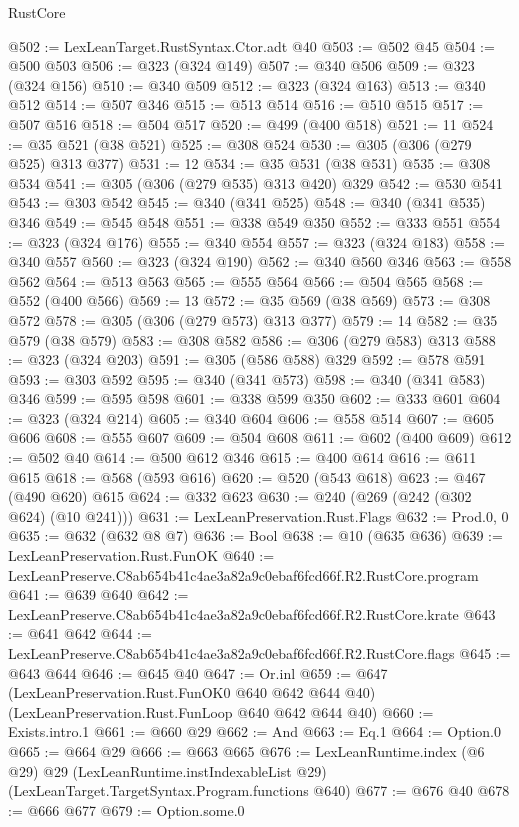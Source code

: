 \begin{lexlean}{RustCore}
\begin{coremodule}
@502 := LexLeanTarget.RustSyntax.Ctor.adt @40
@503 := @502 @45
@504 := @500 @503
@506 := @323 (@324 @149)
@507 := @340 @506
@509 := @323 (@324 @156)
@510 := @340 @509
@512 := @323 (@324 @163)
@513 := @340 @512
@514 := @507 @346
@515 := @513 @514
@516 := @510 @515
@517 := @507 @516
@518 := @504 @517
@520 := @499 (@400 @518)
@521 := 11
@524 := @35 @521 (@38 @521)
@525 := @308 @524
@530 := @305 (@306 (@279 @525) @313 @377)
@531 := 12
@534 := @35 @531 (@38 @531)
@535 := @308 @534
@541 := @305 (@306 (@279 @535) @313 @420) @329
@542 := @530 @541
@543 := @303 @542
@545 := @340 (@341 @525)
@548 := @340 (@341 @535) @346
@549 := @545 @548
@551 := @338 @549 @350
@552 := @333 @551
@554 := @323 (@324 @176)
@555 := @340 @554
@557 := @323 (@324 @183)
@558 := @340 @557
@560 := @323 (@324 @190)
@562 := @340 @560 @346
@563 := @558 @562
@564 := @513 @563
@565 := @555 @564
@566 := @504 @565
@568 := @552 (@400 @566)
@569 := 13
@572 := @35 @569 (@38 @569)
@573 := @308 @572
@578 := @305 (@306 (@279 @573) @313 @377)
@579 := 14
@582 := @35 @579 (@38 @579)
@583 := @308 @582
@586 := @306 (@279 @583) @313
@588 := @323 (@324 @203)
@591 := @305 (@586 @588) @329
@592 := @578 @591
@593 := @303 @592
@595 := @340 (@341 @573)
@598 := @340 (@341 @583) @346
@599 := @595 @598
@601 := @338 @599 @350
@602 := @333 @601
@604 := @323 (@324 @214)
@605 := @340 @604
@606 := @558 @514
@607 := @605 @606
@608 := @555 @607
@609 := @504 @608
@611 := @602 (@400 @609)
@612 := @502 @40
@614 := @500 @612 @346
@615 := @400 @614
@616 := @611 @615
@618 := @568 (@593 @616)
@620 := @520 (@543 @618)
@623 := @467 (@490 @620) @615
@624 := @332 @623
@630 := @240 (@269 (@242 (@302 @624) (@10 @241)))
@631 := LexLeanPreservation.Rust.Flags
@632 := Prod.{0, 0}
@635 := @632 (@632 @8 @7)
@636 := Bool
@638 := @10 (@635 @636)
@639 := LexLeanPreservation.Rust.FunOK
@640 := LexLeanPreserve.C8ab654b41c4ae3a82a9c0ebaf6fcd66f.R2.RustCore.program
@641 := @639 @640
@642 := LexLeanPreserve.C8ab654b41c4ae3a82a9c0ebaf6fcd66f.R2.RustCore.krate
@643 := @641 @642
@644 := LexLeanPreserve.C8ab654b41c4ae3a82a9c0ebaf6fcd66f.R2.RustCore.flags
@645 := @643 @644
@646 := @645 @40
@647 := Or.inl
@659 := @647
    (LexLeanPreservation.Rust.FunOK0 @640 @642 @644 @40)
    (LexLeanPreservation.Rust.FunLoop @640 @642 @644 @40)
@660 := Exists.intro.{1}
@661 := @660 @29
@662 := And
@663 := Eq.{1}
@664 := Option.{0}
@665 := @664 @29
@666 := @663 @665
@676 := LexLeanRuntime.index
    (@6 @29)
    @29
    (LexLeanRuntime.instIndexableList @29)
    (LexLeanTarget.TargetSyntax.Program.functions @640)
@677 := @676 @40
@678 := @666 @677
@679 := Option.some.{0}

\end{coremodule}
\end{lexlean}
